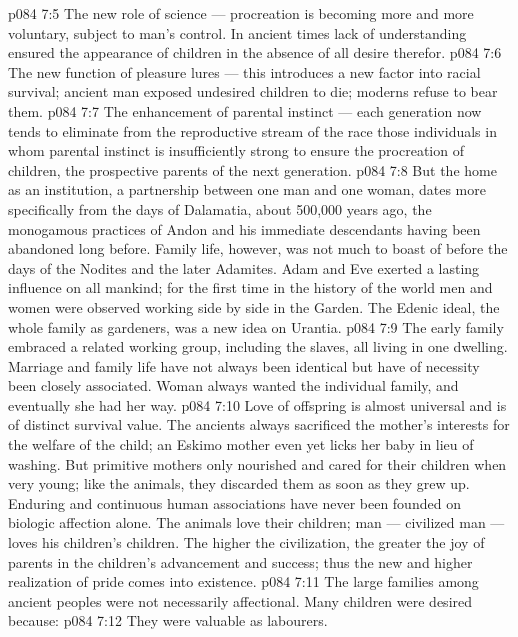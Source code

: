 \vs p084 7:5 \bibnobreakspace The new role of science --- procreation is becoming more and more voluntary, subject to man’s control. In ancient times lack of understanding ensured the appearance of children in the absence of all desire therefor.
\vs p084 7:6 \bibnobreakspace The new function of pleasure lures --- this introduces a new factor into racial survival; ancient man exposed undesired children to die; moderns refuse to bear them.
\vs p084 7:7 \bibnobreakspace The enhancement of parental instinct --- each generation now tends to eliminate from the reproductive stream of the race those individuals in whom parental instinct is insufficiently strong to ensure the procreation of children, the prospective parents of the next generation.
\vs p084 7:8 \pc But the home as an institution, a partnership between one man and one woman, dates more specifically from the days of Dalamatia, about 500,000 years ago, the monogamous practices of Andon and his immediate descendants having been abandoned long before. Family life, however, was not much to boast of before the days of the Nodites and the later Adamites. Adam and Eve exerted a lasting influence on all mankind; for the first time in the history of the world men and women were observed working side by side in the Garden. The Edenic ideal, the whole family as gardeners, was a new idea on Urantia.
\vs p084 7:9 The early family embraced a related working group, including the slaves, all living in one dwelling. Marriage and family life have not always been identical but have of necessity been closely associated. Woman always wanted the individual family, and eventually she had her way.
\vs p084 7:10 \pc Love of offspring is almost universal and is of distinct survival value. The ancients always sacrificed the mother’s interests for the welfare of the child; an Eskimo mother even yet licks her baby in lieu of washing. But primitive mothers only nourished and cared for their children when very young; like the animals, they discarded them as soon as they grew up. Enduring and continuous human associations have never been founded on biologic affection alone. The animals love their children; man --- civilized man --- loves his children’s children. The higher the civilization, the greater the joy of parents in the children’s advancement and success; thus the new and higher realization of  pride comes into existence.
\vs p084 7:11 The large families among ancient peoples were not necessarily affectional. Many children were desired because:
\vs p084 7:12 \bibnobreakspace They were valuable as labourers.
